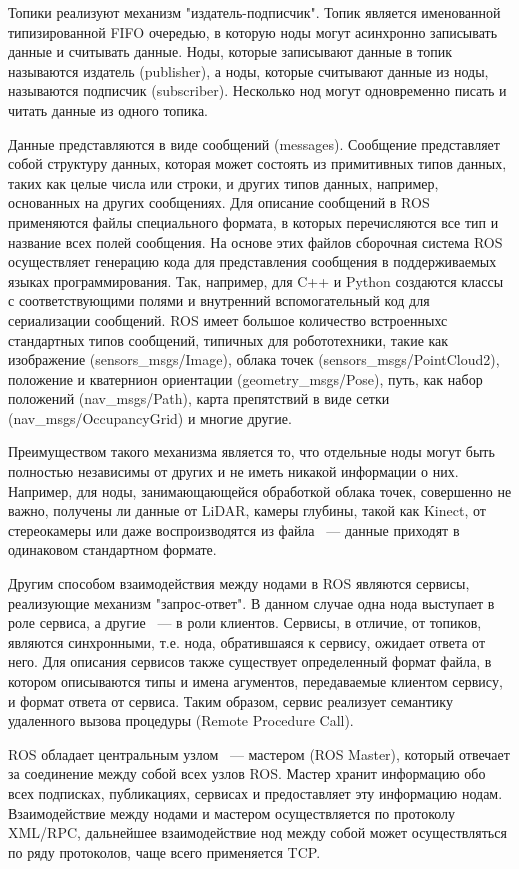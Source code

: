 Топики реализуют механизм "издатель-подписчик". Топик является именованной типизированной FIFO очередью, в которую
ноды могут асинхронно записывать данные и считывать данные. Ноды, которые записывают данные в топик называются
издатель (publisher), а ноды, которые считывают данные из ноды, называются подписчик (subscriber). Несколько нод могут
одновременно писать и читать данные из одного топика.

Данные представляются в виде сообщений (messages). Сообщение
представляет собой структуру данных, которая может состоять из примитивных типов данных, таких как целые числа или
строки, и других типов данных, например, основанных на других сообщениях. Для описание сообщений в ROS применяются
файлы специального формата, в которых перечисляются все тип и название всех полей сообщения. На основе этих файлов
сборочная система ROS осуществляет генерацию кода для представления сообщения в поддерживаемых языках программирования.
Так, например, для C++ и Python создаются классы с соответствующими полями и внутренний вспомогательный код для сериализации
сообщений. ROS имеет большое количество встроенныхс стандартных типов сообщений, типичных для робототехники, такие как
изображение (sensors\_msgs/Image), облака точек (sensors\_msgs/PointCloud2), положение и кватернион ориентации
(geometry\_msgs/Pose), путь, как набор положений (nav\_msgs/Path), карта препятствий в виде сетки (nav\_msgs/OccupancyGrid)
и многие другие.

Преимуществом такого механизма является то, что отдельные ноды могут быть полностью независимы от других и не иметь
никакой информации о них. Например, для ноды, занимающающейся обработкой облака точек, совершенно не важно, получены
ли данные от LiDAR, камеры глубины, такой как Kinect, от стереокамеры или даже воспроизводятся из файла ~---
данные приходят в одинаковом стандартном формате.

Другим способом взаимодействия между нодами в ROS являются сервисы, реализующие механизм "запрос-ответ". В данном случае
одна нода выступает в роле сервиса, а другие ~--- в роли клиентов. Сервисы, в отличие, от топиков, являются синхронными,
т.е. нода, обратившаяся к сервису, ожидает ответа от него. Для описания сервисов также существует определенный формат
файла, в котором описываются типы и имена агументов, передаваемые клиентом сервису, и формат ответа от сервиса.
Таким образом, сервис реализует семантику удаленного вызова процедуры (Remote Procedure Call).

ROS обладает центральным узлом ~--- мастером (ROS Master), который отвечает за соединение между собой всех узлов ROS.
Мастер хранит информацию обо всех подписках, публикациях, сервисах и предоставляет эту информацию нодам. Взаимодействие
между нодами и мастером осуществляется по протоколу XML/RPC, дальнейшее взаимодействие нод между собой может осуществляться
по ряду протоколов, чаще всего применяется TCP.

